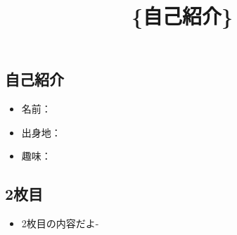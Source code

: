 \documentclass[
  letterpaper,
  DIV=11,
  numbers=noendperiod]{scrartcl}
\title{\{自己紹介\}}
\author{}
\date{}
\providecommand{\tightlist}{%
  \setlength{\itemsep}{0pt}\setlength{\parskip}{0pt}}
\begin{document}
\maketitle


\subsection{自己紹介}\label{ux81eaux5df1ux7d39ux4ecb}

\begin{itemize}
\tightlist
\item
  名前：
\item
  出身地：
\item
  趣味：
\end{itemize}

\subsection{2枚目}\label{ux679aux76ee}

\begin{itemize}
\tightlist
\item
  2枚目の内容だよ-
\end{itemize}
\end{document}
